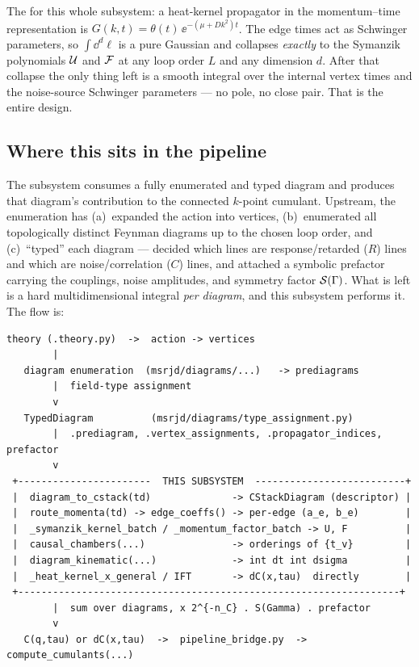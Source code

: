 \begin{defn}
The  for this whole subsystem: a heat-kernel propagator in
the momentum--time representation is $G(k,t)=\theta(t)\,\ee^{-(\mu+Dk^2)t}$. The
edge times act as Schwinger parameters, so $\int\dd^d\ell$ is a pure Gaussian and
collapses \emph{exactly} to the Symanzik polynomials $\mathcal{U}$ and $\mathcal{F}$ at any
loop order $L$ and any dimension $d$. After that collapse the only thing left is a
smooth integral over the internal vertex times and the noise-source Schwinger
parameters --- no pole, no close pair. That is the entire design.
\end{defn}

\subsection{Where this sits in the pipeline}

The subsystem consumes a fully enumerated and typed diagram and produces that
diagram's contribution to the connected $k$-point cumulant. Upstream, the
enumeration has (a)~expanded the action into vertices, (b)~enumerated all
topologically distinct Feynman diagrams up to the chosen loop order, and
(c)~``typed'' each diagram --- decided which lines are response/retarded ($R$)
lines and which are noise/correlation ($C$) lines, and attached a symbolic
prefactor carrying the couplings, noise amplitudes, and symmetry factor
$\mathcal{S}(\Gamma)$. What is left is a hard multidimensional integral \emph{per
diagram}, and this subsystem performs it. The flow is:

\begin{lstlisting}[style=console]
   theory (.theory.py)  ->  action -> vertices
        |
   diagram enumeration  (msrjd/diagrams/...)   -> prediagrams
        |  field-type assignment
        v
   TypedDiagram          (msrjd/diagrams/type_assignment.py)
        |  .prediagram, .vertex_assignments, .propagator_indices, prefactor
        v
 +-----------------------  THIS SUBSYSTEM  --------------------------+
 |  diagram_to_cstack(td)              -> CStackDiagram (descriptor) |
 |  route_momenta(td) -> edge_coeffs() -> per-edge (a_e, b_e)        |
 |  _symanzik_kernel_batch / _momentum_factor_batch -> U, F          |
 |  causal_chambers(...)               -> orderings of {t_v}         |
 |  diagram_kinematic(...)             -> int dt int dsigma          |
 |  _heat_kernel_x_general / IFT       -> dC(x,tau)  directly        |
 +------------------------------------------------------------------+
        |  sum over diagrams, x 2^{-n_C} . S(Gamma) . prefactor
        v
   C(q,tau) or dC(x,tau)  ->  pipeline_bridge.py  ->  compute_cumulants(...)
\end{lstlisting}

